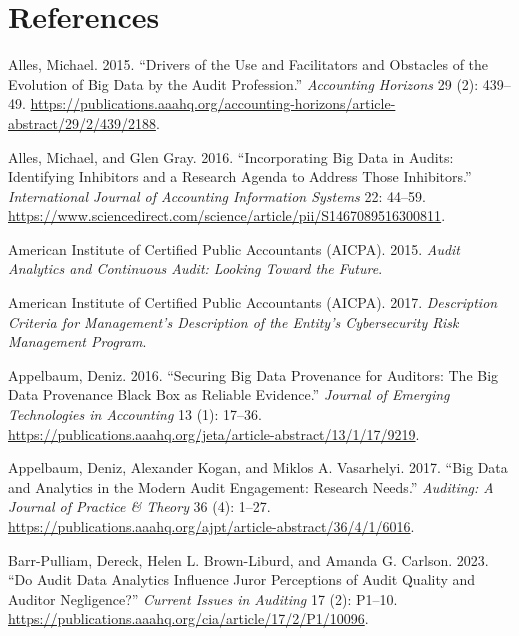\documentclass[
  letterpaper,
  DIV=11,
  numbers=noendperiod]{scrreprt}
\newlength{\cslhangindent}
\newenvironment{CSLReferences}[2] %
 {\begin{list}{}{%
  \setlength{\itemindent}{0pt}
  \setlength{\leftmargin}{0pt}
  \setlength{\parsep}{0pt}
  \ifodd #1
   \setlength{\leftmargin}{\cslhangindent}
   \setlength{\itemindent}{-1\cslhangindent}
  \fi
  \setlength{\itemsep}{#2\baselineskip}}}
 {\end{list}}
\begin{document}
\chapter*{References}\label{references}


\protect{}\label{refs}
\begin{CSLReferences}{1}{1}
Alles, Michael. 2015. {``Drivers of the Use and Facilitators and
Obstacles of the Evolution of Big Data by the Audit Profession.''}
\emph{Accounting Horizons} 29 (2): 439--49.
\url{https://publications.aaahq.org/accounting-horizons/article-abstract/29/2/439/2188}.

Alles, Michael, and Glen Gray. 2016. {``Incorporating Big Data in
Audits: {Identifying} Inhibitors and a Research Agenda to Address Those
Inhibitors.''} \emph{International Journal of Accounting Information
Systems} 22: 44--59.
\url{https://www.sciencedirect.com/science/article/pii/S1467089516300811}.

American Institute of Certified Public Accountants (AICPA). 2015.
\emph{Audit {Analytics} and {Continuous} {Audit}: {Looking} {Toward} the
{Future}}.

American Institute of Certified Public Accountants (AICPA). 2017.
\emph{Description {Criteria} for {Management}'s {Description} of the
{Entity}'s {Cybersecurity} {Risk} {Management} {Program}}.

Appelbaum, Deniz. 2016. {``Securing Big Data Provenance for Auditors:
{The} Big Data Provenance Black Box as Reliable Evidence.''}
\emph{Journal of Emerging Technologies in Accounting} 13 (1): 17--36.
\url{https://publications.aaahq.org/jeta/article-abstract/13/1/17/9219}.

Appelbaum, Deniz, Alexander Kogan, and Miklos A. Vasarhelyi. 2017.
{``Big {Data} and Analytics in the Modern Audit Engagement: {Research}
Needs.''} \emph{Auditing: A Journal of Practice \& Theory} 36 (4):
1--27.
\url{https://publications.aaahq.org/ajpt/article-abstract/36/4/1/6016}.

Barr-Pulliam, Dereck, Helen L. Brown-Liburd, and Amanda G. Carlson.
2023. {``Do {Audit} {Data} {Analytics} {Influence} {Juror} {Perceptions}
of {Audit} {Quality} and {Auditor} {Negligence}?''} \emph{Current Issues
in Auditing} 17 (2): P1--10.
\url{https://publications.aaahq.org/cia/article/17/2/P1/10096}.


\end{CSLReferences}
\end{document}

